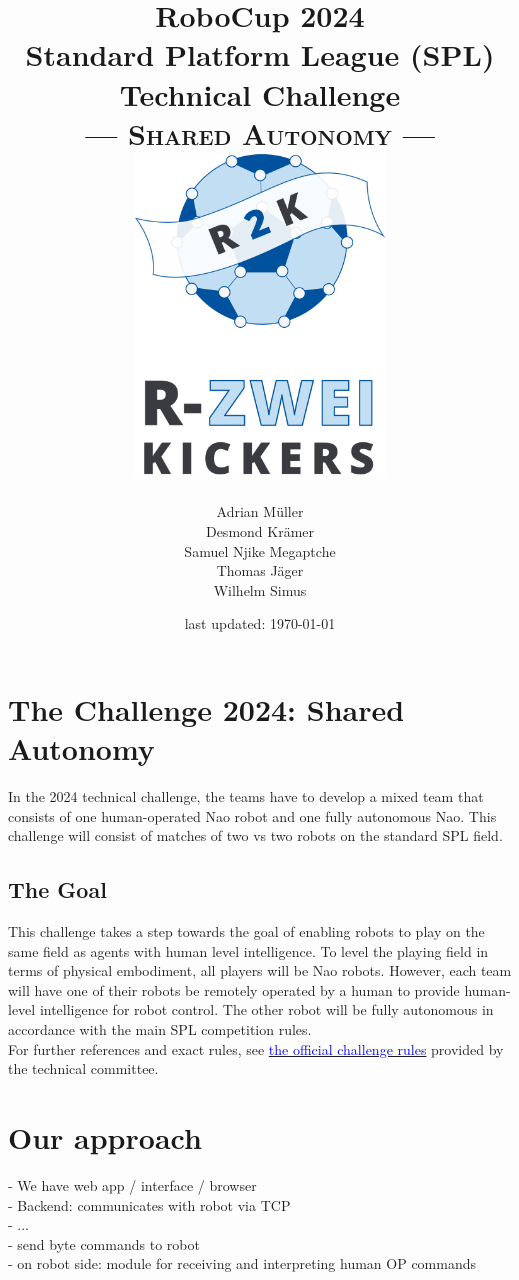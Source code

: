 \documentclass[a4paper]{article}
\title{RoboCup 2024 \\ Standard Platform League (SPL) \\ Technical Challenge \\ --- \textsc{Shared Autonomy} --- \\\vspace{2cm} \includegraphics[width=0.5\textwidth]{img/R2K_Logo}}
\date{last updated: \today}
\author{Adrian Müller \\ Desmond Krämer \\ Samuel Njike Megaptche \\ Thomas Jäger \\ Wilhelm Simus}
\begin{document}
	\setlength{\parindent}{0pt}
	\pagestyle{empty}
	\maketitle
	\newpage
	\pagestyle{headings}
	
	\section{The Challenge 2024: Shared Autonomy}
	
	In the 2024 technical challenge, the teams have to develop a mixed team that consists of one human-operated Nao robot and one fully autonomous Nao.
	This challenge will consist of matches of two vs two robots on the standard SPL field. 
	
	\subsection{The Goal}
	
	This challenge takes a step towards the goal of enabling robots to play on the same field as agents with human level intelligence.
	To level the playing field in terms of physical embodiment, all players will be Nao robots.
	However, each team will have one of their robots be remotely operated by a human to provide human-level intelligence for robot control.
	The other robot will be fully autonomous in accordance with the main SPL competition rules.\\
	
	For further references and exact rules, see \href{https://spl.robocup.org/wp-content/uploads/SPL-Challenges-2024.pdf}{\textcolor{blue}{the official challenge rules}} provided by the technical committee.
	
	\section{Our approach}
	
	- We have web app / interface / browser\\
	- Backend: communicates with robot via TCP\\
	- ...\\
	- send byte commands to robot\\
	- on robot side: module for receiving and interpreting human OP commands\\
	
\end{document}
